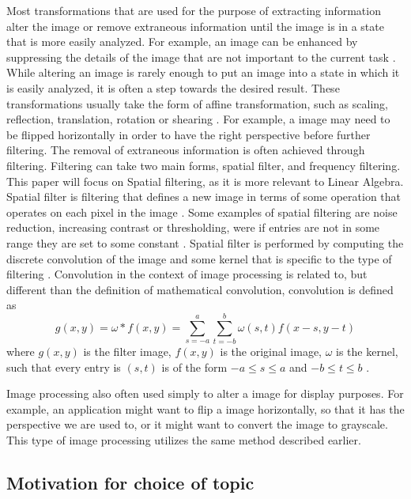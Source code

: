 \documentclass{../mathhomework}
\begin{document}
Most transformations that are used for the purpose of extracting information alter the image or remove 
extraneous information until the image is in a state that is more easily analyzed. For example, an 
image can be enhanced by suppressing the details of the image that are not important to the current 
task \cite{mcconnell03}.
While altering an image is rarely enough to put an image into a state in which it is easily analyzed,
it is often a step towards the desired result. These transformations usually take the form of affine
transformation, such as scaling, reflection, translation, rotation or shearing \cite{gonzalez18}.
For example, a image may need to be flipped horizontally in order to have the right perspective
before further filtering.
The removal of extraneous information is often achieved through filtering. Filtering can take 
two main forms, spatial filter, and frequency filtering. This paper will focus on Spatial filtering, as 
it is more relevant to Linear Algebra. Spatial filter is filtering that defines a new image in terms of 
some operation that operates on each pixel in the image \cite{gonzalez18}. Some examples of spatial 
filtering are noise reduction, increasing contrast or thresholding, were if entries are not in some 
range they are set to some constant \cite{gonzalez18}. Spatial filter is performed by computing the 
discrete convolution of the image and some kernel that is specific to the type of filtering \cite{gonzalez18}. 
Convolution in the context of image processing is related to, but different than the definition of 
mathematical convolution, convolution is defined as
\begin{equation*}
    g(x,y) = \omega * f(x,y) = \sum^a_{s=-a} \sum^b_{t=-b} \omega(s,t) f(x - s, y - t)
\end{equation*}
where $g(x,y)$ is the filter image, $f(x,y)$ is the original image, $\omega$ is the kernel, such that
every entry is $(s,t)$ is of the form $-a \leq s \leq a$ and $-b \leq t \leq b$ \cite{lecarme13}.

Image processing also often used simply to alter a image for display purposes. For example, an application
might want to flip a image horizontally, so that it has the perspective we are used to, or it might want to
convert the image to grayscale. This type of image processing utilizes the same method described earlier.

\subsection{Motivation for choice of topic}
\end{document}

